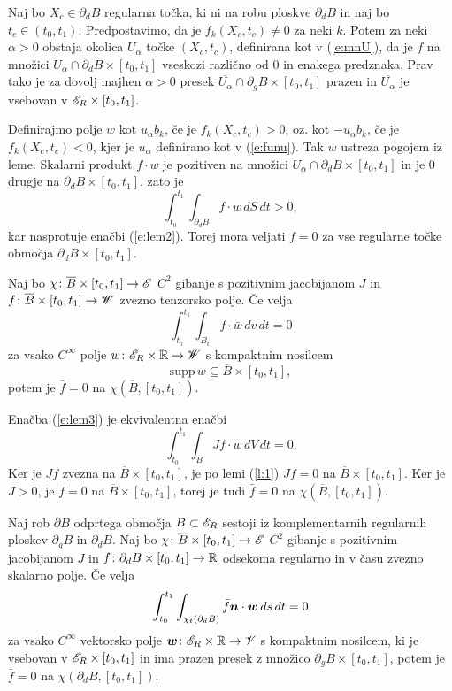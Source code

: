 \proof
	Naj bo $X_c\in\partial_d B$ regularna točka, ki ni na robu ploskve $\partial_d B$ in
	naj bo $t_c\in (t_0,t_1)$. Predpostavimo, da je $f_{k}(X_c,t_c)\neq 0$ za neki $k$. Potem
	za neki $\alpha>0$ obstaja okolica $U_{\alpha}$ točke $(X_c,t_c)$, definirana kot v (\ref{e:mnU}),
	da je $f$ na množici $U_{\alpha}\cap\partial_d B\times[t_0,t_1]$ vseskozi različno od 0 in enakega
	predznaka. Prav tako je za dovolj majhen $\alpha>0$ presek $\overline{U_{\alpha}}\cap\partial_g B\times[t_0,t_1]$
	prazen in $\overline{U_{\alpha}}$ je vsebovan v $\mathscr E_R\times[t_0,t_1]$.
	
	Definirajmo polje $w$ kot $u_{\alpha}b_k$, če je $f_{k}(X_c,t_c) > 0$, oz. kot $-u_{\alpha}b_k$,
	če je $f_{k}(X_c,t_c) < 0$, kjer je $u_{\alpha}$ definirano kot v (\ref{e:funu}). Tak $w$ ustreza pogojem iz leme.
	Skalarni produkt $f\cdot w$ je pozitiven na množici $U_{\alpha}\cap\partial_d B\times[t_0,t_1]$
	in je 0 drugje na $\partial_d B\times [t_0,t_1]$, zato je
	\[ \int_{t_0}^{t_1}\int_{\partial_d B} f\cdot w\,dS\,dt > 0, \]
	kar nasprotuje enačbi (\ref{e:lem2}). Torej mora veljati $f=0$ za vse regularne točke območja
	$\partial_d B\times [t_0,t_1]$.
\endproof

\begin{lema}
	Naj bo $\chi\colon\overline{B}\times[t_0,t_1]\to\mathscr E$ $C^2$ gibanje s pozitivnim jacobijanom $J$ in
	$f\colon\overline{B}\times[t_0,t_1]\to\mathscr W$ zvezno tenzorsko polje. Če velja
	\begin{equation}\label{e:lem3}
		\int_{t_0}^{t_1}\int_{B_t}\bar{f}\cdot \bar{w} \,dv\,dt=0
	\end{equation}
	za vsako $C^{\infty}$ polje $w\colon\mathscr E_R\times\mathbb R\to\mathscr W$ s kompaktnim nosilcem
	\[ \mathrm{supp}\, w\subseteq \overline{B}\times[t_0,t_1], \]
	potem je $\bar{f}=0$ na $\chi(\overline{B},[t_0,t_1])$.
\end{lema}

\proof
	Enačba (\ref{e:lem3}) je ekvivalentna enačbi
	\[ \int_{t_0}^{t_1}\int_{B}Jf\cdot w \,dV\,dt=0. \]
	Ker je $Jf$ zvezna na $\overline{B}\times[t_0,t_1]$, je po lemi (\ref{l:1}) $Jf=0$
	na $\overline{B}\times[t_0,t_1]$. Ker je $J>0$, je $f=0$ na $\overline{B}\times[t_0,t_1]$,
	torej je tudi $\bar{f}=0$ na $\chi(\overline{B},[t_0,t_1])$.
\endproof

\begin{lema}
	Naj rob $\partial B$ odprtega območja $B\subset\mathscr E_R$ sestoji iz komplementarnih regularnih ploskev
	$\partial_g B$ in $\partial_d B$.
	Naj bo $\chi\colon\overline{B}\times[t_0,t_1]\to\mathscr E$ $C^2$ gibanje s pozitivnim jacobijanom $J$ in
	$f\colon\partial_d B\times[t_0,t_1]\to\mathbb R$ odsekoma regularno in v času zvezno skalarno polje.
	Če velja
	\begin{equation}\label{e:lem4}
		\int_{t_0}^{t_1}\int_{\chi_t(\partial_d B)}\bar{f}\boldsymbol n\cdot\bar{\boldsymbol w}\,ds\,dt=0
	\end{equation}
	za vsako $C^{\infty}$ vektorsko polje $\boldsymbol w\colon\mathscr E_R\times\mathbb R\to\mathscr V$ s kompaktnim nosilcem,
	ki je vsebovan v $\mathscr E_R\times[t_0,t_1]$ in ima prazen presek z množico $\partial_g B\times [t_0,t_1]$,
	potem je $\bar{f}=0$ na $\chi(\partial_d B, [t_0,t_1])$.
\end{lema}

